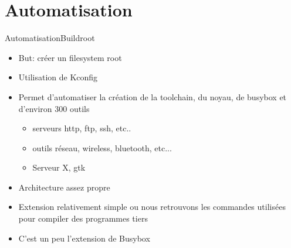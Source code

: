 


\section{Automatisation}

\begin{frame}[fragile=singleslide]{Automatisation}{Buildroot}
  \begin{itemize}
  \item But: créer un filesystem root
  \item Utilisation de Kconfig
  \item Permet d'automatiser la création  de la toolchain, du noyau,
    de busybox et d'environ 300 outils
    \begin{itemize}
    \item serveurs http, ftp, ssh, etc..
    \item outils réseau, wireless, bluetooth, etc...
    \item Serveur X, gtk
    \end{itemize}
  \item Architecture assez propre
  \item Extension relativement simple ou nous retrouvons les commandes
    utilisées pour compiler des programmes tiers
  \item C'est un peu l'extension de Busybox
  \end{itemize}
\end{frame}

